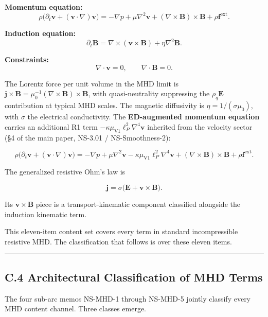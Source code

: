 \documentclass[
  11pt,a4paper]{article}
\begin{document}
\textbf{Momentum equation:}
\[\rho\bigl(\partial_t\mathbf{v} + (\mathbf{v}\cdot\nabla)\mathbf{v}\bigr) = -\nabla p + \mu\nabla^2\mathbf{v} + (\nabla\times\mathbf{B})\times\mathbf{B} + \rho\mathbf{f}^\mathrm{ext}.\]

\textbf{Induction equation:}
\[\partial_t\mathbf{B} = \nabla\times(\mathbf{v}\times\mathbf{B}) + \eta\nabla^2\mathbf{B}.\]

\textbf{Constraints:}
\[\nabla\cdot\mathbf{v} = 0, \qquad \nabla\cdot\mathbf{B} = 0.\]

The Lorentz force per unit volume in the MHD limit is
\(\mathbf{j}\times\mathbf{B} = \mu_0^{-1}(\nabla\times\mathbf{B})\times\mathbf{B}\),
with quasi-neutrality suppressing the \(\rho_q\mathbf{E}\) contribution
at typical MHD scales. The magnetic diffusivity is
\(\eta = 1/(\sigma\mu_0)\), with \(\sigma\) the electrical conductivity.
The \textbf{ED-augmented momentum equation} carries an additional R1
term \(-\kappa\mu_\mathrm{V1}\ell_P^2\nabla^4\mathbf{v}\) inherited from
the velocity sector (§4 of the main paper, NS-3.01 / NS-Smoothness-2):

\[\rho\bigl(\partial_t\mathbf{v} + (\mathbf{v}\cdot\nabla)\mathbf{v}\bigr) = -\nabla p + \mu\nabla^2\mathbf{v} - \kappa\mu_\mathrm{V1}\ell_P^2\nabla^4\mathbf{v} + (\nabla\times\mathbf{B})\times\mathbf{B} + \rho\mathbf{f}^\mathrm{ext}.\]

The generalized resistive Ohm's law is

\[\mathbf{j} = \sigma\bigl(\mathbf{E} + \mathbf{v}\times\mathbf{B}\bigr).\]

Its \(\mathbf{v}\times\mathbf{B}\) piece is a transport-kinematic
component classified alongside the induction kinematic term.

This eleven-item content set covers every term in standard
incompressible resistive MHD. The classification that follows is over
these eleven items.

\begin{center}\rule{0.5\linewidth}{0.5pt}\end{center}

\subsection{C.4 Architectural Classification of MHD
Terms}\label{c.4-architectural-classification-of-mhd-terms}

The four sub-arc memos NS-MHD-1 through NS-MHD-5 jointly classify every
MHD content channel. Three classes emerge.
\end{document}
